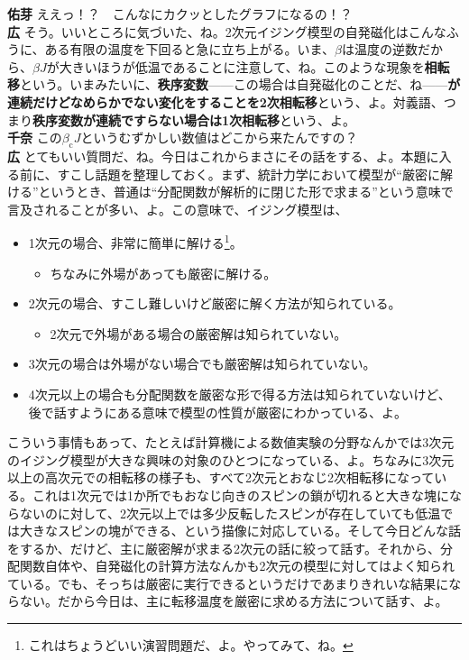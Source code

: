 \documentclass[paper=b5j,fontsize=12Q,jafontsize=12Q,baselineskip=21Q]{jlreq}
\DeclareRobustCommand{\hiron}{\textbf{広 }}
\DeclareRobustCommand{\chinan}{\textbf{千奈 }}
\DeclareRobustCommand{\umen}{\textbf{佑芽 }}
\begin{document}
\begin{refsection}
\begin{center}
\end{center}
\umen ええっ！？　こんなにカクッとしたグラフになるの！？
\\\hiron そう。いいところに気づいた、ね。2次元イジング模型の自発磁化はこんなふうに、ある有限の温度を下回ると急に立ち上がる。いま、$\beta$は温度の逆数だから、$\beta J$が大きいほうが低温であることに注意して、ね。このような現象を\textbf{相転移}という。いまみたいに、\textbf{秩序変数}------この場合は自発磁化のことだ、ね------\textbf{が連続だけどなめらかでない変化をすることを2次相転移}という、よ。対義語、つまり\textbf{秩序変数が連続ですらない場合は1次相転移}という、よ。
\\\chinan この$\beta_{\mathrm c}J$というむずかしい数値はどこから来たんですの？
\\\hiron とてもいい質問だ、ね。今日はこれからまさにその話をする、よ。本題に入る前に、すこし話題を整理しておく。まず、統計力学において模型が``厳密に解ける''というとき、普通は``分配関数が解析的に閉じた形で求まる''という意味で言及されることが多い、よ。この意味で、イジング模型は、
\begin{itemize}
  \item 1次元の場合、非常に簡単に解ける\footnote{これはちょうどいい演習問題だ、よ。やってみて、ね。}。
  \begin{itemize}
    \item ちなみに外場があっても厳密に解ける。
  \end{itemize}
  \item 2次元の場合、すこし難しいけど厳密に解く方法が知られている。
  \begin{itemize}
    \item 2次元で外場がある場合の厳密解は知られていない。
  \end{itemize}
  \item 3次元の場合は外場がない場合でも厳密解は知られていない。
  \item 4次元以上の場合も分配関数を厳密な形で得る方法は知られていないけど、後で話すようにある意味で模型の性質が厳密にわかっている、よ。
\end{itemize}
こういう事情もあって、たとえば計算機による数値実験の分野なんかでは3次元のイジング模型が大きな興味の対象のひとつになっている、よ。ちなみに3次元以上の高次元での相転移の様子も、すべて2次元とおなじ2次相転移になっている。これは1次元では1か所でもおなじ向きのスピンの鎖が切れると大きな塊にならないのに対して、2次元以上では多少反転したスピンが存在していても低温では大きなスピンの塊ができる、という描像に対応している。そして今日どんな話をするか、だけど、主に厳密解が求まる2次元の話に絞って話す。それから、分配関数自体や、自発磁化の計算方法なんかも2次元の模型に対してはよく知られている。でも、そっちは厳密に実行できるというだけであまりきれいな結果にならない。だから今日は、主に転移温度を厳密に求める方法について話す、よ。


\end{refsection}
\end{document}
